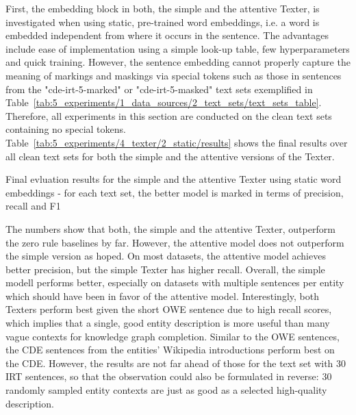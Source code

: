 First, the embedding block in both, the simple and the attentive Texter, is investigated when using static, pre-trained word embeddings, i.e. a word is embedded independent from where it occurs in the sentence. The advantages include ease of implementation using a simple look-up table, few hyperparameters and quick training. However, the sentence embedding cannot properly capture the meaning of markings and maskings via special tokens such as those in sentences from the "cde-irt-5-marked" or "cde-irt-5-masked" text sets exemplified in Table~\ref{tab:5_experiments/1_data_sources/2_text_sets/text_sets_table}. Therefore, all experiments in this section are conducted on the clean text sets containing no special tokens. Table~\ref{tab:5_experiments/4_texter/2_static/results} shows the final results over all clean text sets for both the simple and the attentive versions of the Texter.

\begin{table}[h]
    \centering
    
    \caption{Final evluation results for the simple and the attentive Texter using static word embeddings - for each text set, the better model is marked in terms of precision, recall and F1}
    \label{tab:5_experiments/4_texter/2_static/results}
\end{table}

The numbers show that both, the simple and the attentive Texter, outperform the zero rule baselines by far. However, the attentive model does not outperform the simple version as hoped. On most datasets, the attentive model achieves better precision, but the simple Texter has higher recall. Overall, the simple modell performs better, especially on datasets with multiple sentences per entity which should have been in favor of the attentive model. Interestingly, both Texters perform best given the short OWE sentence due to high recall scores, which implies that a single, good entity description is more useful than many vague contexts for knowledge graph completion. Similar to the OWE sentences, the CDE sentences from the entities' Wikipedia introductions perform best on the CDE. However, the results are not far ahead of those for the text set with 30 IRT sentences, so that the observation could also be formulated in reverse: 30 randomly sampled entity contexts are just as good as a selected high-quality description.

